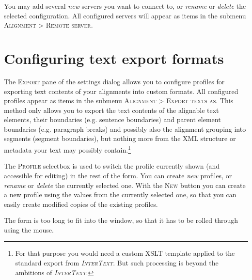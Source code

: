 \documentclass[a4paper,10pt,oneside]{book}
\newcommand{\IT}{\textit{\textsc{InterText}}\xspace}
\newcommand{\menu}[1]{\textsc{#1}}
\begin{document}
You may add several \emph{new} servers you want to connect to, or \emph{rename} or \emph{delete} the selected configuration. All configured servers will appear as items in the submenu \menu{Alignment} > \menu{Remote server}.

\section{Configuring text export formats}\label{ch:detail:config:export}

The \menu{Export} pane of the settings dialog allows you to configure profiles for exporting text contents of your alignments into custom formats. All configured profiles appear as items in the submenu \menu{Alignment} > \menu{Export texts as}. This method only allows you to export the text contents of the alignable text elements, their boundaries (e.g. sentence boundaries) and parent element boundaries (e.g. paragraph breaks) and possibly also the alignment grouping into segments (segment boundaries), but nothing more from the XML structure or metadata your text may possibly contain.\footnote{For that purpose you would need a custom XSLT template applied to the standard export from \IT. But such processing is beyond the ambitions of \IT.}

The \menu{Profile} selectbox is used to switch the profile currently shown (and accessible for editing) in the rest of the form. You can create \emph{new} profiles, or \emph{rename} or \emph{delete} the currently selected one. With the \menu{New} button you can create a new profile using the values from the currently selected one, so that you can easily create modified copies of the existing profiles.

The form is too long to fit into the window, so that it has to be rolled through using the mouse.
\end{document}
